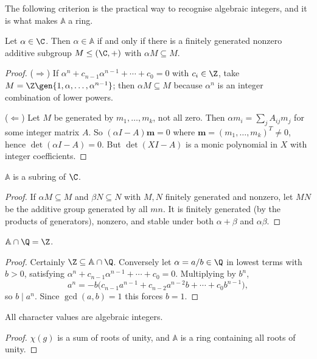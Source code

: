 The following criterion is the practical way to recognise algebraic integers, and it is what makes $\mathbb A$ a ring.

\begin{proposition}
	Let $\alpha\in\C$. Then $\alpha\in\mathbb A$ if and only if there is a finitely generated nonzero additive subgroup $M \leq (\C,+)$ with $\alpha M\subseteq M$.
\end{proposition}
\begin{proof}
	($\Rightarrow$) If $\alpha^n + c_{n-1}\alpha^{n-1}+\cdots+c_0 = 0$ with $c_i\in\Z$, take $M = \Z\gen{1,\alpha,\dots,\alpha^{n-1}}$; then $\alpha M\subseteq M$ because $\alpha^n$ is an integer combination of lower powers.

	($\Leftarrow$) Let $M$ be generated by $m_1,\dots,m_k$, not all zero. Then $\alpha m_i = \sum_j A_{ij}m_j$ for some integer matrix $A$. So $(\alpha I - A)\mathbf m = 0$ where $\mathbf m = (m_1,\dots,m_k)^T\neq 0$, hence $\det(\alpha I - A) = 0$. But $\det(XI - A)$ is a monic polynomial in $X$ with integer coefficients.
\end{proof}

\begin{corollary}
	$\mathbb A$ is a subring of $\C$.
\end{corollary}
\begin{proof}
	If $\alpha M\subseteq M$ and $\beta N\subseteq N$ with $M, N$ finitely generated and nonzero, let $MN$ be the additive group generated by all $mn$. It is finitely generated (by the products of generators), nonzero, and stable under both $\alpha+\beta$ and $\alpha\beta$.
\end{proof}

\begin{proposition}
	$\mathbb A\cap\Q = \Z$.
\end{proposition}
\begin{proof}
	Certainly $\Z\subseteq\mathbb A\cap\Q$. Conversely let $\alpha = a/b\in\Q$ in lowest terms with $b>0$, satisfying $\alpha^n+c_{n-1}\alpha^{n-1}+\cdots+c_0 = 0$. Multiplying by $b^n$,
	$$a^n = -b\big(c_{n-1}a^{n-1}+c_{n-2}a^{n-2}b+\cdots+c_0b^{n-1}\big),$$
	so $b\mid a^n$. Since $\gcd(a,b)=1$ this forces $b = 1$.
\end{proof}

\begin{corollary}
	All character values are algebraic integers.
\end{corollary}
\begin{proof}
	$\chi(g)$ is a sum of roots of unity, and $\mathbb A$ is a ring containing all roots of unity.
\end{proof}


